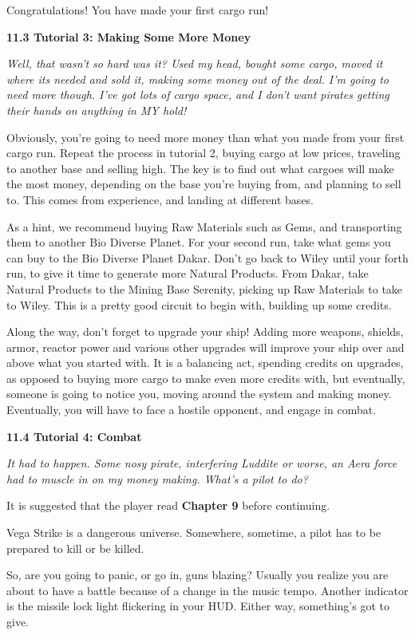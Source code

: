 \documentclass{article}
\begin{document}
Congratulations! You have made your first cargo run! 





\textbf{11.3 Tutorial 3: Making Some More Money }

\textit{Well, that wasn't so hard was it? Used my head, bought some cargo, moved it where its needed and sold it, making some money out of the deal. I'm going to need more though. I've got lots of cargo space, and I don't want pirates getting their hands on anything in MY hold! }

Obviously, you're going to need more money than what you made from your first cargo run. Repeat the process in tutorial 2, buying cargo at low prices, traveling to another base and selling high. The key is to find out what cargoes will make the most money, depending on the base you're buying from, and planning to sell to. This comes from experience, and landing at different bases. 

As a hint, we recommend buying Raw Materials such as Gems, and transporting them to another Bio Diverse Planet. For your second run, take what gems you can buy to the Bio Diverse Planet Dakar. Don't go back to Wiley until your forth run, to give it time to generate more Natural Products. From Dakar, take Natural Products to the Mining Base Serenity, picking up Raw Materials to take to Wiley. This is a pretty good circuit to begin with, building up some credits. 

Along the way, don't forget to upgrade your ship! Adding more weapons, shields, armor, reactor power and various other upgrades will improve your ship over and above what you started with. It is a balancing act, spending credits on upgrades, as opposed to buying more cargo to make even more credits with, but eventually, someone is going to notice you, moving around the system and making money. Eventually, you will have to face a hostile opponent, and engage in combat. 

\textbf{11.4 Tutorial 4: Combat }

\textit{It had to happen. Some nosy pirate, interfering Luddite or worse, an Aera force had to muscle in on my money making. What's a pilot to do? }

It is suggested that the player read \textbf{Chapter 9} before continuing. 

Vega Strike is a dangerous universe.  Somewhere, sometime, a pilot has to be prepared to kill or be killed.   

So, are you going to panic, or go in, guns blazing? Usually you realize you are about to have a battle because of a change in the music tempo. Another indicator is the missile lock light flickering in your HUD.  Either way, something's got to give. 
\end{document}
